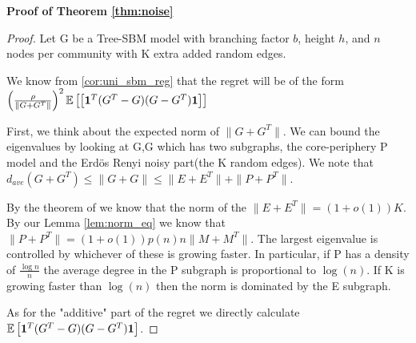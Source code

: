  \noindent\textbf{Proof of Theorem \ref{thm:noise}} \label{proof:noise} 
\begin{proof}
    Let G be a  Tree-SBM model with branching factor $b$, height $h$, and $n$ nodes per community with K extra added random edges. 

    We know from \ref{cor:uni_sbm_reg} that the regret will be of the form  $\left(\frac{\rho}{\|G+G^T\|} \right)^2 \mathbb{E}\left[\left[ \mathbf{1}^T (G^T-G)(G-G^T) \mathbf{1} \right]\right]$
    
    First, we think about the expected norm of $\|G+G^T\|$. We can bound the eigenvalues by looking at G,G which has two subgraphs, the core-periphery  P model and the Erd\"{o}s Renyi noisy part(the K random edges). We note that $d_{ave}(G+G^T) \leq  \|G+G\| \leq \|E+E^T\| + \|P+P^T\|$.
    
    By the theorem of \cite{krivelevich2003largest} we know that the norm of the $\|E+E^T\|= (1+o(1)) K$. By  our Lemma \ref{lem:norm_eq} we know that $\|P+P^T\| = (1+o(1)) p(n) n \| M +M^T\|$. The largest eigenvalue is controlled by whichever of these is growing faster. In particular, if P has a density of $\frac{\log n}{n}$ the average degree in the P subgraph is proportional to $\log (n)$. If K is growing faster than $\log(n)$ then the norm is dominated by the E subgraph. 

    As for the "additive" part of the regret we directly calculate $\mathbb{E}\left[ \mathbf{1}^T (G^T - G)(G-G^T) \mathbf{1}\right] $.
    

\end{proof}
